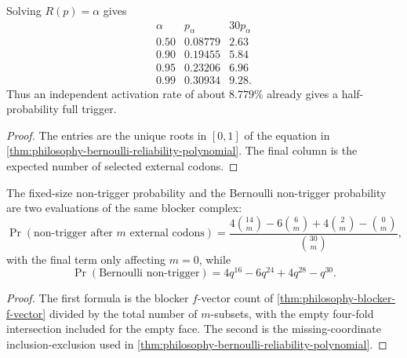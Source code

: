 \begin{corollary}
\label{cor:philosophy-reliability-thresholds}
Solving $R(p)=\alpha$ gives
$$
\begin{array}{c|r|r}
  \alpha & p_{\alpha} & 30p_{\alpha}\\
  \hline
  0.50 & 0.08779 & 2.63\\
  0.90 & 0.19455 & 5.84\\
  0.95 & 0.23206 & 6.96\\
  0.99 & 0.30934 & 9.28.
\end{array}
$$
Thus an independent activation rate of about $8.779\%$ already gives
a half-probability full trigger.
\end{corollary}
\begin{proof}
The entries are the unique roots in $[0,1]$ of the equation in
\autoref{thm:philosophy-bernoulli-reliability-polynomial}. The final
column is the expected number of selected external codons.
\end{proof}

\begin{corollary}
\label{cor:philosophy-blocker-probability-models}
The fixed-size non-trigger probability and the Bernoulli non-trigger
probability are two evaluations of the same blocker complex:
$$
  \Pr(\text{non-trigger after }m\text{ external codons})
  =
  \frac{
  4\binom{14}{m}
  -
  6\binom{6}{m}
  +
  4\binom{2}{m}
  -
  \binom{0}{m}
  }{\binom{30}{m}},
$$
with the final term only affecting $m=0$, while
$$
  \Pr(\text{Bernoulli non-trigger})
  =
  4q^{16}-6q^{24}+4q^{28}-q^{30}.
$$
\end{corollary}
\begin{proof}
The first formula is the blocker $f$-vector count of
\autoref{thm:philosophy-blocker-f-vector} divided by the total number
of $m$-subsets, with the empty four-fold intersection included for the
empty face. The second is the missing-coordinate inclusion-exclusion
used in \autoref{thm:philosophy-bernoulli-reliability-polynomial}.
\end{proof}

